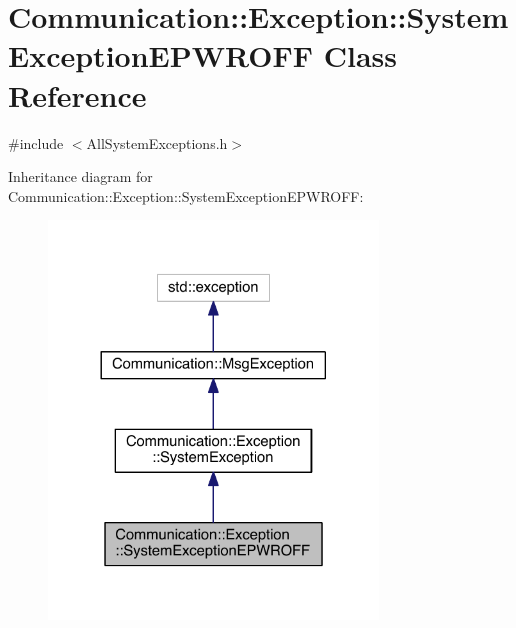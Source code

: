 \hypertarget{class_communication_1_1_exception_1_1_system_exception_e_p_w_r_o_f_f}{}\section{Communication\+:\+:Exception\+:\+:System\+Exception\+E\+P\+W\+R\+O\+F\+F Class Reference}
\label{class_communication_1_1_exception_1_1_system_exception_e_p_w_r_o_f_f}


{\ttfamily \#include $<$All\+System\+Exceptions.\+h$>$}



Inheritance diagram for Communication\+:\+:Exception\+:\+:System\+Exception\+E\+P\+W\+R\+O\+F\+F\+:\nopagebreak
\begin{figure}[H]
\begin{center}
\leavevmode
\includegraphics[width=248pt]{class_communication_1_1_exception_1_1_system_exception_e_p_w_r_o_f_f__inherit__graph}
\end{center}
\end{figure}


